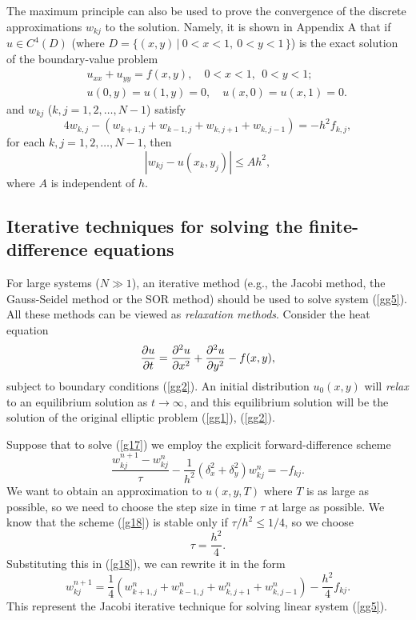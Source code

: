 The maximum principle can also be used
to prove the convergence of the discrete approximations $w_{kj}$ to the solution. Namely, it is shown
in Appendix A that if $u\in C^{4}(D)$ (where $D=\{(x,y)\, \vert \ 0<x<1, \ 0<y<1 \, \}$)
is the exact solution of the boundary-value
problem
\begin{eqnarray}
&&u_{xx}+u_{yy} = f(x,y), \quad 0<x<1, \ \ 0<y<1;     \label{gg1} \\
&&u(0,y) = u(1,y) = 0, \quad
u(x,0) =u(x,1) = 0.   \label{gg2}
\end{eqnarray}
and $w_{kj}$ ($k,j=1,2, \dots,N-1$) satisfy
\begin{equation}
4w_{k,j}-\left(w_{k+1,j}+w_{k-1,j}+w_{k,j+1}+w_{k,j-1}\right)
=-h^{2}f_{k,j}, \label{gg5}
\end{equation}
for each $k,j=1,2,\dots,N-1$, then
\[
\left\vert w_{kj}-u(x_{k}, y_{j})\right\vert \leq Ah^{2},
\]
where $A$ is independent of $h$.



\subsection{Iterative techniques for solving the finite-difference equations}
For large systems ($N\gg 1$), an iterative
method (e.g., the Jacobi method, the Gauss-Seidel method or the SOR method) should
be used to solve system (\ref{gg5}). All these methods can be viewed as {\it relaxation methods}.
Consider the heat equation
\begin{equation}
\frac{{\partial} u}{{\partial} t}=\frac{{\partial}^2 u}{{\partial} x^2}+\frac{{\partial}^2 u}{{\partial} y^2} - f(x,y),   \label{g17}
\end{equation}
subject to boundary conditions (\ref{gg2}). An initial distribution $u_{0}(x,y)$ will {\it relax} to
an equilibrium solution as $t\to\infty$, and this equilibrium solution will be the solution of the
original elliptic problem (\ref{gg1}), (\ref{gg2}).


Suppose that to solve (\ref{g17}) we employ the explicit forward-difference scheme
\begin{equation}
\frac{w_{kj}^{n+1}-w_{kj}^{n}}{\tau} -\frac{1}{h^2}\left(
\delta_{x}^2+\delta_{y}^2\right)w_{kj}^{n}=-f_{kj}. \label{g18}
\end{equation}
We want to obtain an approximation to $u(x,y,T)$ where $T$ is as large as possible,
so we need to choose the step size in time $\tau$ at large as possible. We know that the
scheme (\ref{g18}) is stable only if $\tau/h^2\leq 1/4$, so we choose
\[
\tau=\frac{h^2}{4}.
\]
Substituting this in (\ref{g18}), we can rewrite it in the form
\begin{equation}
w_{kj}^{n+1}=\frac{1}{4}\left(w^{n}_{k+1,j}+w^{n}_{k-1,j}+w^{n}_{k,j+1}+w^{n}_{k,j-1}\right)
-\frac{h^2}{4}f_{kj}. \label{g19}
\end{equation}
This represent the Jacobi iterative technique for solving
linear system (\ref{gg5}).


